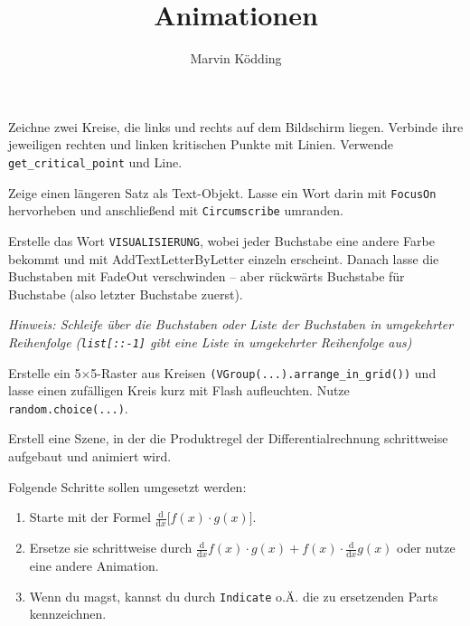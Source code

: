 \documentclass[a4paper, 12pt]{mksheetphhd}
\title{Animationen}
\author{Marvin Ködding}
\begin{document}
	\printtitle
	
	\vspace*{.5cm}
	
	\begin{aufgabe}
		Zeichne zwei Kreise, die links und rechts auf dem Bildschirm liegen. Verbinde ihre jeweiligen rechten und linken kritischen Punkte mit Linien. Verwende \verb|get_critical_point| und Line.
	\end{aufgabe}
	
	\begin{aufgabe}
		Zeige einen längeren Satz als Text-Objekt. Lasse ein Wort darin mit \verb|FocusOn| hervorheben und anschließend mit \verb|Circumscribe| umranden.
	\end{aufgabe}
	
	\begin{aufgabe}
		Erstelle das Wort \texttt{VISUALISIERUNG}, wobei jeder Buchstabe eine andere Farbe bekommt und mit AddTextLetterByLetter einzeln erscheint. Danach lasse die Buchstaben mit FadeOut verschwinden – aber rückwärts Buchstabe für Buchstabe (also letzter Buchstabe zuerst).
		
		{\it Hinweis: Schleife über die Buchstaben oder Liste der Buchstaben in umgekehrter Reihenfolge (\verb|list[::-1]| gibt eine Liste in umgekehrter Reihenfolge aus)}
	\end{aufgabe}
	
	\begin{aufgabe}
		Erstelle ein 5×5-Raster aus Kreisen \verb|(VGroup(...).arrange_in_grid())| und lasse einen zufälligen Kreis kurz mit Flash aufleuchten. Nutze \verb|random.choice(...)|.
	\end{aufgabe}
	
	\begin{aufgabe}
		Erstell eine Szene, in der die Produktregel der Differentialrechnung schrittweise aufgebaut und animiert wird.
		
		Folgende Schritte sollen umgesetzt werden:
		\begin{enumerate}
			\item Starte mit der Formel \(\frac{\mathrm{d}}{\mathrm{d}x} \bigl[f(x) \cdot g(x)\bigr]\).
			\item Ersetze sie schrittweise durch \(\frac{\mathrm{d}}{\mathrm{d}x}f(x) \cdot g(x) + f(x) \cdot \frac{\mathrm{d}}{\mathrm{d}x}g(x)\) oder nutze eine andere Animation.
			\item Wenn du magst, kannst du durch \verb*|Indicate| o.Ä. die zu ersetzenden Parts kennzeichnen.
		\end{enumerate}
	\end{aufgabe}
	
\end{document}
